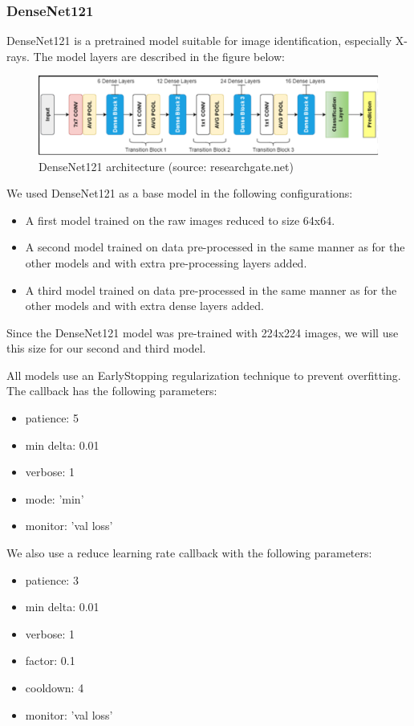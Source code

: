 \documentclass{article}
\begin{document}
\subsubsection{DenseNet121}
DenseNet121 is a pretrained model suitable for image identification, especially X-rays. The model layers are described in the figure below:\\

\begin{figure}[H]
    \centering
    \includegraphics[width=0.8\linewidth]{DN121architecture.png}
    \caption{DenseNet121 architecture (source: researchgate.net)}
    \label{fig:DN121architecture}
\end{figure}

We used DenseNet121 as a base model in the following configurations:
\begin{itemize}
    \item A first model trained on the raw images reduced to size 64x64.
    \item A second model trained on data pre-processed in the same manner as for the other models and with extra pre-processing layers added.
    \item A third model trained on data pre-processed in the same manner as for the other models and with extra dense layers added.
\end{itemize}
 Since the DenseNet121 model was pre-trained with 224x224 images, we will use this size for our second and third model.

All models use an EarlyStopping regularization technique to prevent overfitting. The callback has the following parameters:

\begin{itemize}
    \item patience: 5
    \item min delta: 0.01
    \item verbose: 1
    \item mode: 'min'
    \item  monitor: 'val loss'
\end{itemize} 

We also use a reduce learning rate callback with the following parameters:

\begin{itemize}
    \item patience: 3
    \item min delta: 0.01
    \item verbose: 1
    \item factor: 0.1
    \item cooldown: 4
    \item  monitor: 'val loss'
\end{itemize} 
\end{document}
